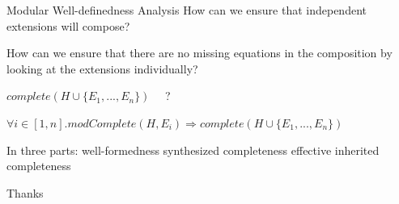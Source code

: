 \documentclass[11pt,aspectratio=169]{beamer}
\begin{document}
\begin{frame}[t]{Modular Well-definedness Analysis}
How can we ensure that independent extensions will compose?

\medskip
How can we ensure that there are no missing equations in the
composition by looking at the extensions individually?

\bigskip

$\mathit{complete} ( H \cup \{ E_1, ... , E_n \} ) $ \ \ ?

\bigskip

$\forall i \in [1,n] . \mathit{modComplete}(H, E_i) 
 \Rightarrow \mathit{complete}( H \cup \{ E_1, ..., E_n \} )$

\bigskip
In three parts:
\be
 \x well-formedness
 \x synthesized completeness
 \x effective inherited completeness
\ee
\end{frame}


\begin{frame}{Thanks}
\end{frame}
\end{document}
